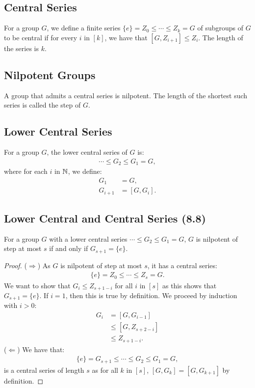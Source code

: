 \subsection{Central Series}

For a group $G$, we define a finite series 
$\{e\} = Z_0 \leq \cdots \leq Z_k = G$ of subgroups of $G$ to be 
central if for every $i$ in $[k]$, we have that 
$[G, Z_{i + 1}] \leq Z_{i}$. The length of the series is $k$.

\subsection{Nilpotent Groups}

A group that admits a central series is nilpotent. The
length of the shortest such series is called the step of $G$.

\subsection{Lower Central Series}

For a group $G$, the lower central series of $G$ is: \begin{align*}
     \cdots \leq G_2 \leq G_1 = G,
\end{align*} where for each $i$ in $\mathbb{N}$, we define:
\begin{align*}
    G_1 &= G, \\
    G_{i + 1} &= [G, G_i].
\end{align*}

\subsection{Lower Central and Central Series (8.8)} \label{8.8}

For a group $G$ with a lower central series 
$\cdots \leq G_2 \leq G_1 = G$, $G$ is nilpotent of step at most
$s$ if and only if $G_{s + 1} = \{e\}$.

\begin{proof}
    ($\Longrightarrow$) As $G$ is nilpotent of step at most $s$,
    it has a central series: \begin{align*}
        \{e\} = Z_0 \leq \cdots \leq Z_s = G.
    \end{align*} We want to show that $G_i \leq Z_{s + 1 - i}$
    for all $i$ in $[s]$ as this shows that $G_{s + 1} = \{e\}$. 
    If $i = 1$, then this is true by definition.
    We proceed by induction with $i > 0$: \begin{align*}
        G_i 
        &= [G, G_{i - 1}] \\
        &\leq [G, Z_{s + 2 - i}] \tag{IH} \\
        &\leq Z_{s + 1 - i}.
    \end{align*}
    ($\Longleftarrow$) We have that: \begin{align*}
        \{e\} = G_{s + 1} \leq \cdots \leq G_2 \leq G_1 = G,
    \end{align*} is a central series of length $s$ as
    for all $k$ in $[s]$, $[G, G_k] = [G, G_{k + 1}]$
    by definition. 
\end{proof}

